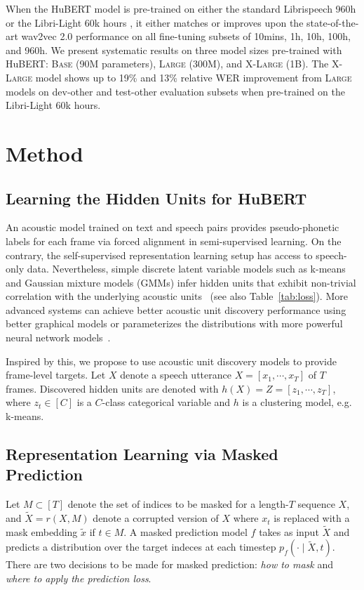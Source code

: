 When the HuBERT model is pre-trained on either the standard Librispeech 960h \cite{panayotov2015librispeech} or the Libri-Light 60k hours \cite{kahn2020libri}, it either matches or improves upon the state-of-the-art wav2vec 2.0 \cite{baevski2020wav2vec} performance on all fine-tuning subsets of 10mins, 1h, 10h, 100h, and 960h. We present systematic results on three model sizes pre-trained with HuBERT: \textsc{Base} (90M parameters), \textsc{Large} (300M), and \textsc{X-Large} (1B). The \textsc{X-Large} model shows up to 19\% and 13\% relative WER improvement from \textsc{Large} models on dev-other and test-other evaluation subsets when pre-trained on the Libri-Light 60k hours.

\section{Method}
\subsection{Learning the Hidden Units for HuBERT} An acoustic model trained on text and speech pairs provides pseudo-phonetic labels for each frame via forced alignment in semi-supervised learning. On the contrary, the self-supervised representation learning setup has access to speech-only data. Nevertheless, simple discrete latent variable models such as k-means and Gaussian mixture models (GMMs) infer hidden units that exhibit non-trivial correlation with the underlying acoustic units~\cite{lee2012nonparametric} (see also Table~\ref{tab:loss}). More advanced systems can achieve better acoustic unit discovery performance using better graphical models \cite{ondel2016variational, ebbers2017hidden} or parameterizes the distributions with more powerful neural network models~\cite{hsu2017learning, hsu2017unsupervised, chorowski2019unsupervised, khurana2019factorial, khurana2020convolutional}.

Inspired by this, we propose to use acoustic unit discovery models to provide frame-level targets. Let $X$ denote a speech utterance $X = [x_1, \cdots, x_T]$ of $T$ frames. Discovered hidden units are denoted with $h(X) = Z = [z_1, \cdots, z_T]$, where $z_t \in [C]$ is a $C$-class categorical variable and $h$ is a clustering model, e.g. k-means. 

\subsection{Representation Learning via Masked Prediction}\label{sec:maskpred}
Let $M \subset [T]$ denote the set of indices to be masked for a length-$T$ sequence $X$, and $\tilde{X} = r(X, M)$ denote a corrupted version of $X$ where $x_t$ is replaced with a mask embedding $\tilde{x}$ if $t \in M$. A masked prediction model $f$ takes as input $\tilde{X}$ and predicts a distribution over the target indeces at each timestep $p_f(\cdot \mid \tilde{X}, t)$. There are two decisions to be made for masked prediction: \textit{how to mask} and \textit{where to apply the prediction loss}. 


